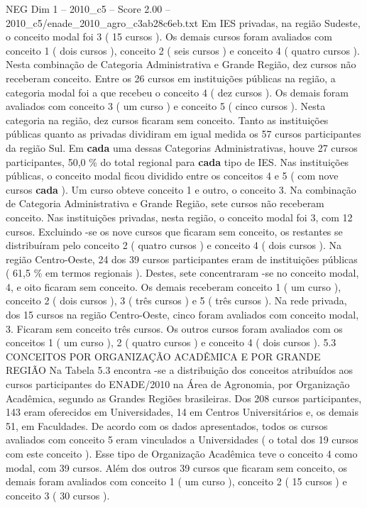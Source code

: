 \begin{textsample}{NEG Dim 1 – 2010\_c5 – Score 2.00 – 2010\_c5/enade\_2010\_agro\_c3ab28c6eb.txt}
Em IES privadas, na região Sudeste, o conceito modal foi 3 ( 15 cursos ).
Os demais cursos foram avaliados com conceito 1 ( dois cursos ), conceito 2 ( seis cursos ) e conceito 4 ( quatro cursos ).
Nesta combinação de Categoria Administrativa e Grande Região, dez cursos não receberam conceito.
Entre os 26 cursos em instituições públicas na região, a categoria modal foi a que recebeu o conceito 4 ( dez cursos ).
Os demais foram avaliados com conceito 3 ( um curso ) e conceito 5 ( cinco cursos ).
Nesta categoria na região, dez cursos ficaram sem conceito.
Tanto as instituições públicas quanto as privadas dividiram em igual medida os 57 cursos participantes da região Sul.
Em \textbf{cada} uma dessas Categorias Administrativas, houve 27 cursos participantes, 50,0 \% do total regional para \textbf{cada} tipo de IES.
Nas instituições públicas, o conceito modal ficou dividido entre os conceitos 4 e 5 ( com nove cursos \textbf{cada} ).
Um curso obteve conceito 1 e outro, o conceito 3.
Na combinação de Categoria Administrativa e Grande Região, sete cursos não receberam conceito.
Nas instituições privadas, nesta região, o conceito modal foi 3, com 12 cursos.
Excluindo -se os nove cursos que ficaram sem conceito, os restantes se distribuíram pelo conceito 2 ( quatro cursos ) e conceito 4 ( dois cursos ).
Na região Centro-Oeste, 24 dos 39 cursos participantes eram de instituições públicas ( 61,5 \% em termos regionais ).
Destes, sete concentraram -se no conceito modal, 4, e oito ficaram sem conceito.
Os demais receberam conceito 1 ( um curso ), conceito 2 ( dois cursos ), 3 ( três cursos ) e 5 ( três cursos ).
Na rede privada, dos 15 cursos na região Centro-Oeste, cinco foram avaliados com conceito modal, 3.
Ficaram sem conceito três cursos.
Os outros cursos foram avaliados com os conceitos 1 ( um curso ), 2 ( quatro cursos ) e conceito 4 ( dois cursos ). 5.3 CONCEITOS POR ORGANIZAÇÃO ACADÊMICA E POR GRANDE REGIÃO Na Tabela 5.3 encontra -se a distribuição dos conceitos atribuídos aos cursos participantes do ENADE/2010 na Área de Agronomia, por Organização Acadêmica, segundo as Grandes Regiões brasileiras.
Dos 208 cursos participantes, 143 eram oferecidos em Universidades, 14 em Centros Universitários e, os demais 51, em Faculdades.
De acordo com os dados apresentados, todos os cursos avaliados com conceito 5 eram vinculados a Universidades ( o total dos 19 cursos com este conceito ).
Esse tipo de Organização Acadêmica teve o conceito 4 como modal, com 39 cursos.
Além dos outros 39 cursos que ficaram sem conceito, os demais foram avaliados com conceito 1 ( um curso ), conceito 2 ( 15 cursos ) e conceito 3 ( 30 cursos ).

\end{textsample}
